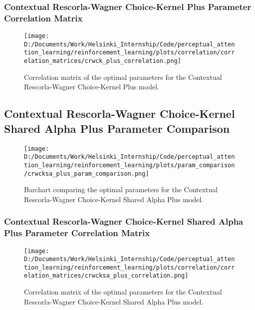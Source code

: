 \documentclass[12pt]{article}
\newcommand{\correlation}{0.25}
\newcommand{\parameter}{0.35}
\begin{document}
\subsubsection{Contextual Rescorla-Wagner Choice-Kernel Plus Parameter Correlation Matrix}

\begin{figure}[h]  %
	\centering
	\texttt{[image: D:/Documents/Work/Helsinki\_Internship/Code/perceptual\_attention\_learning/reinforcement\_learning/plots/correlation/correlation\_matrices/crwck\_plus\_correlation.png]}  %
	\caption{Correlation matrix of the optimal parameters for the Contextual Rescorla-Wagner Choice-Kernel Plus model.}
	\label{fig:crwck_plus_correlation_matrix}
\end{figure} 
\newpage

\subsection{Contextual Rescorla-Wagner Choice-Kernel Shared Alpha Plus Parameter Comparison}

\begin{figure}[h]  %
	\centering
	\texttt{[image: D:/Documents/Work/Helsinki\_Internship/Code/perceptual\_attention\_learning/reinforcement\_learning/plots/param\_comparison/crwcksa\_plus\_param\_comparison.png]}  %
	\caption{Barchart comparing the optimal parameters for the Contextual Rescorla-Wagner Choice-Kernel Shared Alpha Plus model.}
	\label{fig:crwcksa_plus_model_parmeters}
\end{figure} 

\subsubsection{Contextual Rescorla-Wagner Choice-Kernel Shared Alpha Plus Parameter Correlation Matrix}
\begin{figure}[h]  %
	\centering
	\texttt{[image: D:/Documents/Work/Helsinki\_Internship/Code/perceptual\_attention\_learning/reinforcement\_learning/plots/correlation/correlation\_matrices/crwcksa\_plus\_correlation.png]}  %
	\caption{Correlation matrix of the optimal parameters for the Contextual Rescorla-Wagner Choice-Kernel Shared Alpha Plus model.}
	\label{fig:crwcksa_plus_correlation_matrix}
\end{figure} 
\end{document}
